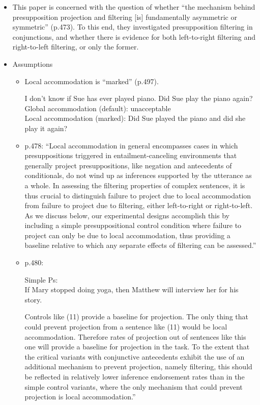 \documentclass[11pt,fleqn]{article}
\newcommand{\6}{\mbox{$[\hspace*{-.6mm}[$}}
\newcommand{\9}{\mbox{$]\hspace*{-.6mm}]$}}
\begin{document}
\begin{itemize}

\item This paper is concerned with the question of whether ``the mechanism behind presupposition projection and filtering [is] fundamentally asymmetric or symmetric'' (p.473). To this end, they investigated presupposition filtering in conjunctions, and whether there is evidence for both left-to-right filtering and right-to-left filtering, or only the former.

\item Assumptions

\begin{itemize}

\item Local accommodation is ``marked'' (p.497).

\begin{exe}
\ex  I don't know if Sue has ever played piano. Did Sue play the piano again?
\\ Global accommodation (default): unacceptable
\\ Local accommodation (marked): Did Sue played the piano and did she play it again?
\end{exe}

\item p.478: ``Local accommodation in general encompasses cases in which presuppositions triggered in entailment-canceling environments that generally project presuppositions, like negation and antecedents of conditionals, do not wind up as inferences supported by the utterance as a whole. In assessing the filtering properties of complex sentences, it is thus crucial to distinguish failure to project due to local accommodation from failure to project due to filtering, either left-to-right or right-to-left. As we discuss below, our experimental designs accomplish this by including a simple presuppositional control condition where failure to project can only be due to local accommodation, thus providing a baseline relative to which any separate effects of filtering can be assessed.''

\item p.480:

\begin{exe}
 Simple Ps:\\
If Mary stopped doing yoga, then Matthew will interview her for his story.
\end{exe}

Controls like (11) provide a baseline for projection. The only thing that could prevent projection from a sentence like (11) would be local accommodation. Therefore rates of projection out of sentences like this one will provide a baseline for projection in the task. To the extent that the critical variants with conjunctive antecedents exhibit the use of an additional mechanism to prevent projection, namely filtering, this should be reflected in relatively lower inference endorsement rates than in the simple control variants, where the only mechanism that could prevent projection is local accommodation.''



\end{itemize}
\end{itemize}
\end{document}
